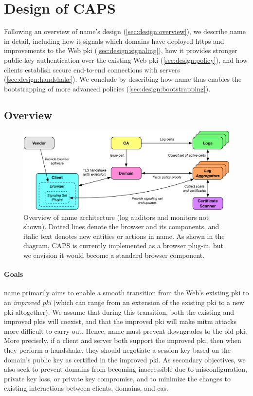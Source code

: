 \section{Design of CAPS}
\label{sec:design}

Following an overview of \ac{name}'s design (\autoref{sec:design:overview}), we
describe \ac{name} in detail, including how it signals which domains have
deployed \ac{https} and improvements to the Web \ac{pki}
(\autoref{sec:design:signaling}), how it provides stronger public-key
authentication over the existing Web \ac{pki} (\autoref{sec:design:policy}), and
how clients establish secure end-to-end connections with servers
(\autoref{sec:design:handshake}). We conclude by describing how \ac{name} thus
enables the bootstrapping of more advanced policies
(\autoref{sec:design:bootstrapping}).

\subsection{Overview}
\label{sec:design:overview}

\begin{figure}
  \centering
  \includegraphics[width=0.8\linewidth]{fig/arch}
  \caption{Overview of \ac{name} architecture (log auditors and monitors not
  shown). Dotted lines denote the browser and its components, and italic text
denotes new entities or actions in \ac{name}.  As shown in the diagram,
CAPS is currently implemented as a browser plug-in, but we envision it
would become a standard browser component.
  }
  \label{fig:overview}
\end{figure}

\paragraph{Goals}
\ac{name} primarily aims to enable a smooth transition from the Web's existing
\ac{pki} to an \emph{improved \ac{pki}} (which can range from an extension of
the existing \ac{pki} to a new \ac{pki} altogether). We assume that during this
transition, both the existing and improved \acp{pki} will coexist, and that the
improved \ac{pki} will make \ac{mitm} attacks more difficult to carry out.
Hence, \ac{name} must prevent downgrades to the old \ac{pki}. More precisely, if
a client and server both support the improved \ac{pki}, then when they perform a
handshake, they should negotiate a session key based on the domain's public key
as certified in the improved \ac{pki}. As secondary objectives, we also seek to
prevent domains from becoming inaccessible due to misconfiguration, private key
loss, or private key compromise, and to minimize the changes to existing
interactions between clients, domains, and \acp{ca}.

